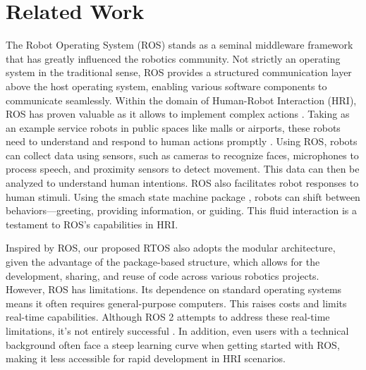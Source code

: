 \documentclass[runningheads]{llncs}
\begin{document}


\section{Related Work}

The Robot Operating System (ROS) \cite{Quigley2009} stands as a seminal middleware framework that has greatly influenced the robotics community. Not strictly an operating system in the traditional sense, ROS provides a structured communication layer above the host operating system, enabling various software components to communicate seamlessly. 
 Within the domain of Human-Robot Interaction (HRI), ROS has proven valuable as it allows to implement complex actions \cite{Mohamed2021}. Taking as an example service robots in public spaces like malls or airports, these robots need to understand and respond to human actions promptly \cite{Mintrom2022}. Using ROS, robots can collect data using sensors, such as cameras to recognize faces, microphones to process speech, and proximity sensors to detect movement. This data can then be analyzed to understand human intentions. ROS also facilitates robot responses to human stimuli. Using the smach state machine package \cite{SmashStateMachine}, robots can shift between behaviors—greeting, providing information, or guiding. This fluid interaction is a testament to ROS's capabilities in HRI.

Inspired by ROS, our proposed RTOS also adopts the modular architecture, given the advantage of the package-based structure, which allows for the development, sharing, and reuse of code across various robotics projects. 
However, ROS has limitations. Its dependence on standard operating systems means it often requires general-purpose computers. This raises costs and limits real-time capabilities. Although ROS 2 attempts to address these real-time limitations, it's not entirely successful \cite{Macenski2022}. In addition, even users with a technical background often face a steep learning curve when getting started with ROS, making it less accessible for rapid development in HRI scenarios. 
\end{document}
